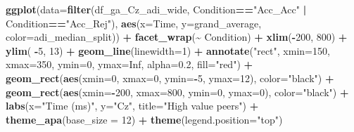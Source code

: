 \documentclass[
]{article}
\newenvironment{Shaded}{\begin{snugshade}}{\end{snugshade}}
\newcommand{\AttributeTok}[1]{\textcolor[rgb]{0.13,0.29,0.53}{#1}}
\newcommand{\ConstantTok}[1]{\textcolor[rgb]{0.56,0.35,0.01}{#1}}
\newcommand{\DecValTok}[1]{\textcolor[rgb]{0.00,0.00,0.81}{#1}}
\newcommand{\FloatTok}[1]{\textcolor[rgb]{0.00,0.00,0.81}{#1}}
\newcommand{\FunctionTok}[1]{\textcolor[rgb]{0.13,0.29,0.53}{\textbf{#1}}}
\newcommand{\NormalTok}[1]{#1}
\newcommand{\SpecialCharTok}[1]{\textcolor[rgb]{0.81,0.36,0.00}{\textbf{#1}}}
\newcommand{\StringTok}[1]{\textcolor[rgb]{0.31,0.60,0.02}{#1}}
\begin{document}
\begin{Shaded}
\begin{Highlighting}[]
\FunctionTok{ggplot}\NormalTok{(}\AttributeTok{data=}\FunctionTok{filter}\NormalTok{(df\_ga\_Cz\_adi\_wide, Condition}\SpecialCharTok{==}\StringTok{"Acc\_Acc"} \SpecialCharTok{|}\NormalTok{ Condition}\SpecialCharTok{==}\StringTok{"Acc\_Rej"}\NormalTok{), }\FunctionTok{aes}\NormalTok{(}\AttributeTok{x=}\NormalTok{Time, }\AttributeTok{y=}\NormalTok{grand\_average, }\AttributeTok{color=}\NormalTok{adi\_median\_split)) }\SpecialCharTok{+}
  \FunctionTok{facet\_wrap}\NormalTok{(}\SpecialCharTok{\textasciitilde{}}\NormalTok{ Condition) }\SpecialCharTok{+}
  \FunctionTok{xlim}\NormalTok{(}\SpecialCharTok{{-}}\DecValTok{200}\NormalTok{, }\DecValTok{800}\NormalTok{) }\SpecialCharTok{+}
  \FunctionTok{ylim}\NormalTok{( }\SpecialCharTok{{-}}\DecValTok{5}\NormalTok{, }\DecValTok{13}\NormalTok{) }\SpecialCharTok{+}
  \FunctionTok{geom\_line}\NormalTok{(}\AttributeTok{linewidth=}\DecValTok{1}\NormalTok{) }\SpecialCharTok{+}
  \FunctionTok{annotate}\NormalTok{(}\StringTok{"rect"}\NormalTok{, }\AttributeTok{xmin=}\DecValTok{150}\NormalTok{, }\AttributeTok{xmax=}\DecValTok{350}\NormalTok{, }\AttributeTok{ymin=}\DecValTok{0}\NormalTok{, }\AttributeTok{ymax=}\ConstantTok{Inf}\NormalTok{, }\AttributeTok{alpha=}\FloatTok{0.2}\NormalTok{, }\AttributeTok{fill=}\StringTok{"red"}\NormalTok{) }\SpecialCharTok{+}
  \FunctionTok{geom\_rect}\NormalTok{(}\FunctionTok{aes}\NormalTok{(}\AttributeTok{xmin=}\DecValTok{0}\NormalTok{, }\AttributeTok{xmax=}\DecValTok{0}\NormalTok{, }\AttributeTok{ymin=}\SpecialCharTok{{-}}\DecValTok{5}\NormalTok{, }\AttributeTok{ymax=}\DecValTok{12}\NormalTok{), }\AttributeTok{color=}\StringTok{"black"}\NormalTok{) }\SpecialCharTok{+}
  \FunctionTok{geom\_rect}\NormalTok{(}\FunctionTok{aes}\NormalTok{(}\AttributeTok{xmin=}\SpecialCharTok{{-}}\DecValTok{200}\NormalTok{, }\AttributeTok{xmax=}\DecValTok{800}\NormalTok{, }\AttributeTok{ymin=}\DecValTok{0}\NormalTok{, }\AttributeTok{ymax=}\DecValTok{0}\NormalTok{), }\AttributeTok{color=}\StringTok{"black"}\NormalTok{) }\SpecialCharTok{+}
  \FunctionTok{labs}\NormalTok{(}\AttributeTok{x=}\StringTok{"Time (ms)"}\NormalTok{, }\AttributeTok{y=}\StringTok{"Cz"}\NormalTok{, }\AttributeTok{title=}\StringTok{"High value peers"}\NormalTok{) }\SpecialCharTok{+}
  \FunctionTok{theme\_apa}\NormalTok{(}\AttributeTok{base\_size =} \DecValTok{12}\NormalTok{) }\SpecialCharTok{+} \FunctionTok{theme}\NormalTok{(}\AttributeTok{legend.position=}\StringTok{"top"}\NormalTok{)}
\end{Highlighting}
\end{Shaded}
\end{document}

